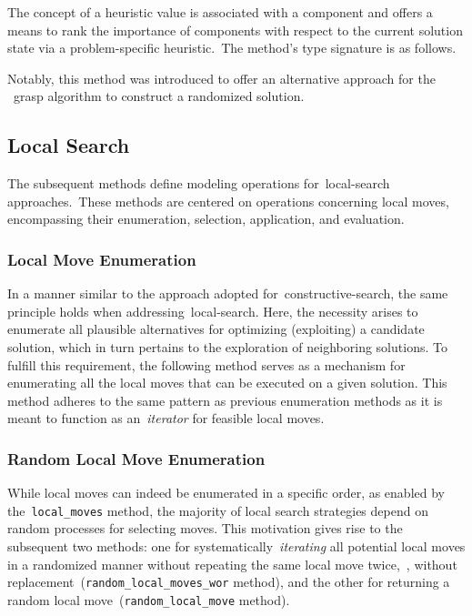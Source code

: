 The concept of a heuristic value is associated with a component and offers a
means to rank the importance of components with respect to the current solution
state via a problem-specific heuristic.~The method's type signature is as
follows.

\begin{center}
\end{center}

Notably, this method was introduced to offer an alternative approach for the
~\acrshort{grasp} algorithm to construct a randomized solution.

\subsection{Local Search}

The subsequent methods define modeling operations for~\acrshort{local-search}
approaches.~These methods are centered on operations concerning local moves,
encompassing their enumeration, selection, application, and evaluation.

\subsubsection*{Local Move Enumeration}

In a manner similar to the approach adopted for~\acrshort{constructive-search},
the same principle holds when addressing~\acrshort{local-search}. Here, the
necessity arises to enumerate all plausible alternatives for optimizing
(exploiting) a candidate solution, which in turn pertains to the exploration of
neighboring solutions. To fulfill this requirement, the following method serves
as a mechanism for enumerating all the local moves that can be executed on a
given solution. This method adheres to the same pattern as previous enumeration
methods as it is meant to function as an~\emph{iterator} for feasible local
moves.

\begin{center}
\end{center}

\subsubsection*{Random Local Move Enumeration}

While local moves can indeed be enumerated in a specific order, as enabled by
the~\texttt{local\_moves} method, the majority of local search strategies depend on random
processes for selecting moves. This motivation gives rise to the subsequent two
methods: one for systematically~\emph{iterating} all potential local moves in a
randomized manner without repeating the same local move twice,~\ie{}, without
replacement~(\texttt{random\_local\_moves\_wor} method), and the other for returning a random local
move~(\texttt{random\_local\_move} method).

